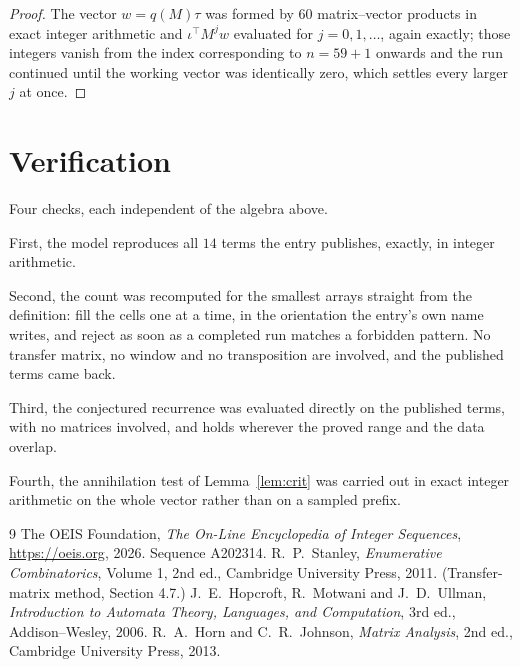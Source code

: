 \documentclass[11pt,a4paper]{article}
\theoremstyle{plain}
\theoremstyle{definition}
\begin{document}
\begin{proof}
The vector $w=q(M)\tau$ was formed by $60$ matrix--vector products in exact integer
arithmetic and $\iota^{\!\top}M^{j}w$ evaluated for $j=0,1,\dots$, again exactly; those
integers vanish from the index corresponding to $n=59+1$ onwards and the run continued
until the working vector was identically zero, which settles every larger $j$ at once.
\end{proof}

\section{Verification}

Four checks, each independent of the algebra above.

First, the model reproduces all $14$ terms the entry publishes, exactly, in integer
arithmetic.

Second, the count was recomputed for the smallest arrays straight from the definition: fill the
cells one at a time, in the orientation the entry's own name writes, and reject as soon as a
completed run matches a forbidden pattern. No transfer matrix, no window and no transposition
are involved, and the published terms came back.

Third, the conjectured recurrence was evaluated directly on the published terms, with no
matrices involved, and holds wherever the proved range and the data overlap.

Fourth, the annihilation test of Lemma~\ref{lem:crit} was carried out in exact integer
arithmetic on the whole vector rather than on a sampled prefix.

\begin{thebibliography}{9}
 The OEIS Foundation, \emph{The On-Line Encyclopedia of Integer
Sequences}, \url{https://oeis.org}, 2026. Sequence A202314.
 R.~P.~Stanley, \emph{Enumerative Combinatorics}, Volume 1, 2nd ed.,
Cambridge University Press, 2011. (Transfer-matrix method, Section 4.7.)
 J.~E.~Hopcroft, R.~Motwani and J.~D.~Ullman, \emph{Introduction to Automata
Theory, Languages, and Computation}, 3rd ed., Addison--Wesley, 2006.
 R.~A.~Horn and C.~R.~Johnson, \emph{Matrix Analysis}, 2nd ed., Cambridge
University Press, 2013.
\end{thebibliography}
\end{document}
